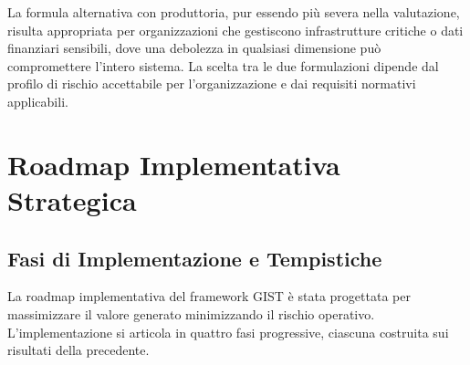 La formula alternativa con produttoria, pur essendo più severa nella valutazione, risulta appropriata per organizzazioni che gestiscono infrastrutture critiche o dati finanziari sensibili, dove una debolezza in qualsiasi dimensione può compromettere l'intero sistema. La scelta tra le due formulazioni dipende dal profilo di rischio accettabile per l'organizzazione e dai requisiti normativi applicabili.

\section{\texorpdfstring{\textbf{Roadmap Implementativa Strategica}}{5.4 - Roadmap Implementativa Strategica}}
\label{sec:5.4}

\subsection{\texorpdfstring{\textbf{Fasi di Implementazione e Tempistiche}}{5.4.1 - Fasi di Implementazione e Tempistiche}}
\label{subsec:5.4.1}

La roadmap implementativa del framework GIST è stata progettata per massimizzare il valore generato minimizzando il rischio operativo. L'implementazione si articola in quattro fasi progressive, ciascuna costruita sui risultati della precedente.

